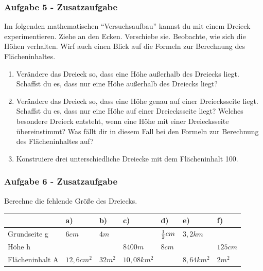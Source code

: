 \documentclass[
  ngerman,
]{book}
\begin{document}
\hypertarget{aufgabe-5---zusatzaufgabe}{%
\subsubsection*{\texorpdfstring{Aufgabe 5 - \textbf{Zusatzaufgabe}}{Aufgabe 5 - Zusatzaufgabe}}\label{aufgabe-5---zusatzaufgabe}}

Im folgenden mathematischen ``Versuchsaufbau'' kannst du mit einem Dreieck experimentieren. Ziehe an den Ecken. Verschiebe sie. Beobachte, wie sich die Höhen verhalten. Wirf auch einen Blick auf die Formeln zur Berechnung des Flächeninhaltes.

\begin{enumerate}
\def\labelenumi{\alph{enumi})}
\item
  Verändere das Dreieck so, dass eine Höhe außerhalb des Dreiecks liegt. Schaffst du es, dass nur eine Höhe außerhalb des Dreiecks liegt?
\item
  Verändere das Dreieck so, dass eine Höhe genau auf einer Dreiecksseite liegt. Schaffst du es, dass nur eine Höhe auf einer Dreiecksseite liegt? Welches besondere Dreieck entsteht, wenn eine Höhe mit einer Dreiecksseite übereinstimmt? Was fällt dir in diesem Fall bei den Formeln zur Berechnung des Flächeninhaltes auf?
\item
  Konstruiere drei unterschiedliche Dreiecke mit dem Flächeninhalt 100.
\end{enumerate}

\hypertarget{aufgabe-6---zusatzaufgabe}{%
\subsubsection*{\texorpdfstring{Aufgabe 6 - \textbf{Zusatzaufgabe}}{Aufgabe 6 - Zusatzaufgabe}}\label{aufgabe-6---zusatzaufgabe}}

Berechne die fehlende Größe des Dreiecks.

\begin{longtable}[]{@{}lllllll@{}}
\toprule
& a) & b) & c) & d) & e) & f)\tabularnewline
\midrule
\endhead
Grundseite g & \(6 cm\) & \(4 m\) & & \({1 \over 2}cm\) & \(3,2 km\) &\tabularnewline
Höhe h & & & \(8400 m\) & \(8cm\) & & \(125cm\)\tabularnewline
Flächeninhalt A & \(12,6 cm^2\) & \(32 m^2\) & \(10,08 km^2\) & & \(8,64 km^2\) & \(2 m^2\)\tabularnewline
\bottomrule
\end{longtable}
\end{document}
